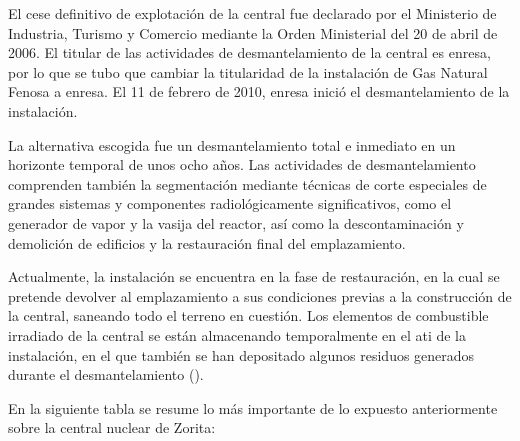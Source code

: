 El cese definitivo de explotación de la central fue declarado por el Ministerio de Industria, Turismo y Comercio mediante la Orden Ministerial del 20 de abril de 2006. El titular de las actividades de desmantelamiento de la central es \acrshort{enresa}, por lo que se tubo que cambiar la titularidad de la instalación de Gas Natural Fenosa a \acrshort{enresa}. El 11 de febrero de 2010, \acrshort{enresa} inició el desmantelamiento de la instalación.

La alternativa escogida fue un desmantelamiento total e inmediato en un horizonte temporal de unos ocho años. Las actividades de desmantelamiento comprenden también la segmentación mediante técnicas de corte especiales de grandes sistemas y componentes radiológicamente significativos, como el generador de vapor y la vasija del reactor, así como la descontaminación y demolición de edificios y la restauración final del emplazamiento. 

Actualmente, la instalación se encuentra en la fase de restauración, en la cual se pretende devolver al emplazamiento a sus condiciones previas a la construcción de la central, saneando todo el terreno en cuestión. Los elementos de combustible irradiado de la central se están almacenando temporalmente en el \acrfull{ati} de la instalación, en el que también se han depositado algunos residuos generados durante el desmantelamiento (\cite{enresa_desmantelamiento_zorita}).

En la siguiente tabla se resume lo más importante de lo expuesto anteriormente sobre la central nuclear de Zorita:

